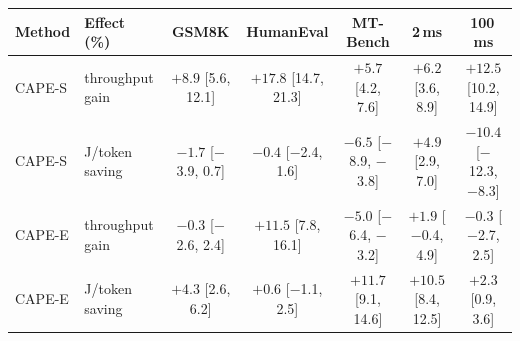 \begin{tabular}{@{}llccccc@{}}
\toprule
Method & Effect (\%) & GSM8K & HumanEval & MT-Bench & 2\,ms & 100\,ms\\
\midrule
CAPE-S & throughput gain & $+8.9$ [5.6, 12.1] & $+17.8$ [14.7, 21.3] & $+5.7$ [4.2, 7.6] & $+6.2$ [3.6, 8.9] & $+12.5$ [10.2, 14.9] \\
CAPE-S & J/token saving & $-1.7$ [$-$3.9, 0.7] & $-0.4$ [$-$2.4, 1.6] & $-6.5$ [$-$8.9, $-$3.8] & $+4.9$ [2.9, 7.0] & $-10.4$ [$-$12.3, $-$8.3] \\
CAPE-E & throughput gain & $-0.3$ [$-$2.6, 2.4] & $+11.5$ [7.8, 16.1] & $-5.0$ [$-$6.4, $-$3.2] & $+1.9$ [$-$0.4, 4.9] & $-0.3$ [$-$2.7, 2.5] \\
CAPE-E & J/token saving & $+4.3$ [2.6, 6.2] & $+0.6$ [$-$1.1, 2.5] & $+11.7$ [9.1, 14.6] & $+10.5$ [8.4, 12.5] & $+2.3$ [0.9, 3.6] \\
\bottomrule
\end{tabular}
